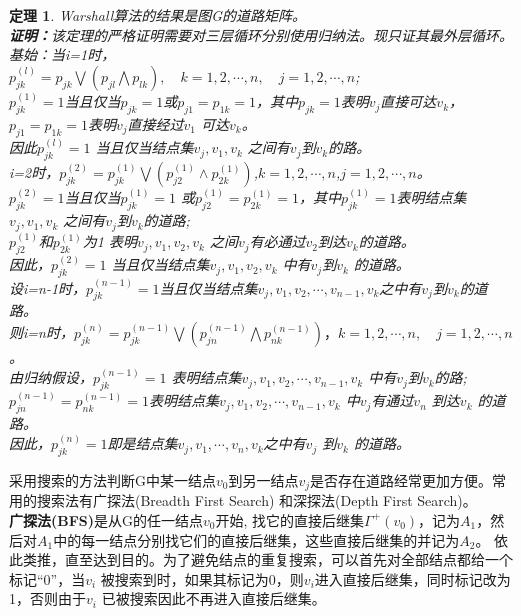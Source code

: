 \documentclass[11pt,a4paper,openany]{book}
\newtheorem{theorem}{\textbf{定理}}[section]
\begin{document}
\begin{theorem}Warshall算法的结果是图G的道路矩阵。\\
\K \textbf{证明：}该定理的严格证明需要对三层循环分别使用归纳法。现只证其最外层循环。\\
基始：当i=1时，\\
$p_{jk}^{(l)}=p_{jk}\bigvee (p_{jl}\bigwedge p_{lk}),\quad k=1,2,\cdots,n, \quad j=1,2,\cdots,n$;\\
$p_{jk}^{(1)}=1$当且仅当$p_{jk}=1$或$p_{j1}=p_{1k}=1$，其中$p_{jk}=1$表明$v_j$直接可达$v_k$，\\
$p_{j1}=p_{1k}=1$表明$v_j$直接经过$v_1$ 可达$v_k$。\\
因此$p_{jk}^{(l) }=1$ 当且仅当结点集{$v_j,v_1,v_k$ } 之间有$v_j$到$v_k$的路。\\
 \indent i=2时，$p_{jk}^{(2)}=p_{jk}^{(1)}\bigvee(p_{j2}^{(1)}∧p_{2k}^{(1)})$,$k=1,2,\cdots,n$,\quad $j=1,2,\cdots,n$。\\
 $p_{jk}^{(2)}=1$当且仅当$p_{jk}^{(1)}=1$ 或$ p_{j2}^{(1)}=p_{2k}^{(1)} =1$，其中$p_{jk}^{(1)}=1$表明结点集{$v_j,v_1,v_k$ }之间有$v_j$到$v_k$的道路;\\$p_{j2}^{(1)} $和$p_{2k}^{(1)}$为1 表明{$v_j,v_1,v_2,v_k $} 之间$v_j$有必通过$v_2$到达$v_k$的道路。\\
 因此，$p_{jk}^{(2)}=1$ 当且仅当结点集{$v_j,v_1,v_2,v_k $} 中有$v_j$到$v_k$ 的道路。\\
\indent 设i=n-1时，$p_{jk}^{(n-1)}=1$当且仅当结点集{$v_j,v_1,v_2,\cdots,v_{n-1},v_k$}之中有$v_j$到$v_k$的道路。\\
\indent 则i=n时，$p_{jk}^{(n)}=p_{jk}^{(n-1)}\bigvee(p_{jn}^{(n-1)}\bigwedge p_{nk}^{(n-1)})，k=1,2,\cdots,n,\quad j=1,2,\cdots,n$。\\由归纳假设，$p_{jk}^{(n-1)}=1 $ 表明结点集{$v_j,v_1,v_2,\cdots,v_{n-1},v_k$ }中有$v_j$到$v_k$的路;\\
$p_{jn}^{(n-1)}=p_{nk}^{(n-1)}=1$表明结点集{$v_j,v_1,v_2,\cdots,v_{n-1},v_k$ }中$v_j$有通过$v_n$ 到达$v_k$ 的道路。\\
因此，$p_{jk}^{(n)}=1$即是结点集{$v_j,v_1,\cdots,v_n,v_k $}之中有$v_j$ 到$v_k$ 的道路。\\
\end{theorem}
\indent 采用搜索的方法判断G中某一结点$v_0$到另一结点$v_j$是否存在道路经常更加方便。常用的搜索法有广探法(Breadth First Search) 和深探法(Depth First Search)。
\\ \indent \textbf{广探法(BFS)}是从G的任一结点$v_0$开始, 找它的直接后继集$Γ^+ (v_0)$，记为$A_1$，然后对$A_1$中的每一结点分别找它们的直接后继集，这些直接后继集的并记为$A_2$。 依此类推，直至达到目的。为了避免结点的重复搜索，可以首先对全部结点都给一个标记“0”，当$v_i$ 被搜索到时，如果其标记为0，则$v_i$进入直接后继集，同时标记改为1，否则由于$v_i$ 已被搜索因此不再进入直接后继集。
\end{document}
